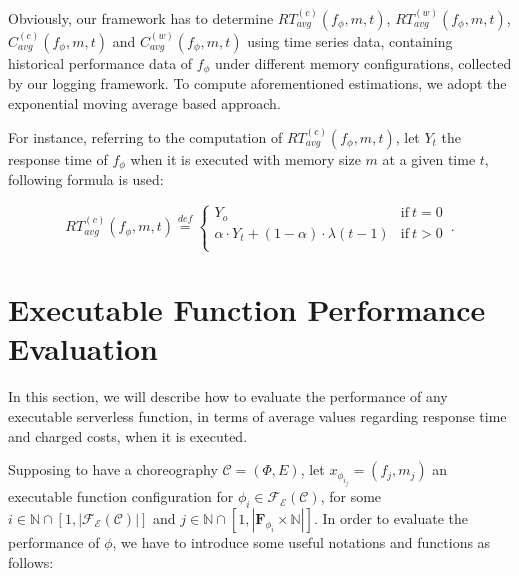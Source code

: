 \documentclass[12pt,a4paper]{report}
\newcommand{\mathDef}{\overset{\textit{def}}{=}}
\newcommand{\N}{\mathbb{N}}
\begin{document}
Obviously, our framework has to determine $RT_{avg}^{(c)}(f_{\phi}, m,t)$, $RT_{avg}^{(w)}(f_{\phi}, m,t)$, $C_{avg}^{(c)}(f_{\phi}, m,t)$ and $C_{avg}^{(w)}(f_{\phi}, m,t)$ using time series data, containing historical performance data of $f_{\phi}$ under different memory configurations, collected by our logging framework. To compute aforementioned estimations, we adopt the exponential moving average based approach.

For instance, referring to the computation of $RT_{avg}^{(c)}(f_{\phi}, m,t)$, let $Y_t$ the response time of $f_{\phi}$ when it is executed with memory size $m$ at a given time $t$, following formula is used:

\begin{equation}
	RT_{avg}^{(c)}(f_{\phi}, m,t) \mathDef
	\begin{cases}
		Y_o & \text{if}\ t = 0\\ 
		\alpha \cdot Y_t + (1 - \alpha) \cdot \lambda(t-1) & \text{if}\ t > 0\\
		
	\end{cases}\,.
\end{equation}

\section{Executable Function Performance Evaluation}

In this section, we will describe how to evaluate the performance of any executable serverless function, in terms of average values regarding response time and charged costs, when it is executed. 

Supposing to have a choreography $\mathcal{C} = (\Phi,E)$, let $x_{\phi_{i_{j}}} = (f_j, m_j)$ an executable function configuration for $\phi_i \in \mathscr{F_E}(\mathcal{C})$, for some $i \in \N \cap [1,|\mathscr{F_E}(\mathcal{C})|]$ and $j \in \N \cap [1,|\textbf{F}_{\phi_{i}} \times \N|]$. In order to evaluate the performance of $\phi$, we have to introduce some useful notations and functions as follows:
\end{document}
